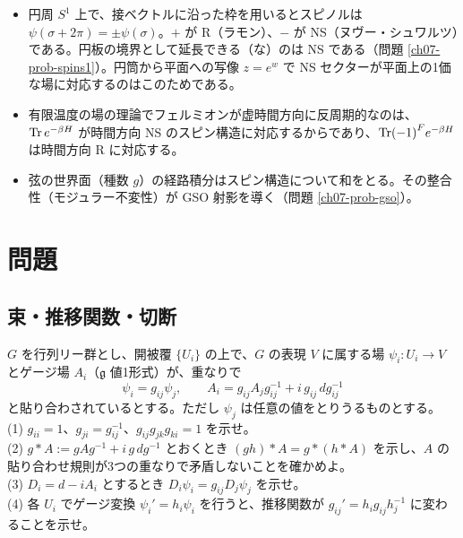 \begin{physbox}[：スピン構造とフェルミオンの境界条件]
\begin{itemize}
\item 円周 $S^1$ 上で、接ベクトルに沿った枠を用いるとスピノルは $\psi(\sigma+2\pi)=\pm\psi(\sigma)$。$+$ が R（ラモン）、$-$ が NS（ヌヴー・シュワルツ）である。円板の境界として延長できる（な）のは NS である（問題 \ref{ch07-prob-spins1}）。円筒から平面への写像 $z=e^{w}$ で NS セクターが平面上の1価な場に対応するのはこのためである。
\item 有限温度の場の理論でフェルミオンが虚時間方向に反周期的なのは、$\Tr e^{-\beta H}$ が時間方向 NS のスピン構造に対応するからであり、$\Tr(-1)^Fe^{-\beta H}$ は時間方向 R に対応する。
\item 弦の世界面（種数 $g$）の経路積分はスピン構造について和をとる。その整合性（モジュラー不変性）が GSO 射影を導く（問題 \ref{ch07-prob-gso}）。
\end{itemize}
\end{physbox}

\section{問題}

\subsection{束・推移関数・切断}

\begin{problem}[難易度 A]\label{ch07-prob-cocycle}
$G$ を行列リー群とし、開被覆 $\{U_i\}$ の上で、$G$ の表現 $V$ に属する場 $\psi_i\colon U_i\to V$ とゲージ場 $A_i$（$\mathfrak g$ 値1形式）が、重なりで
\[
\psi_i=g_{ij}\psi_j,\qquad A_i=g_{ij}A_jg_{ij}^{-1}+i\,g_{ij}\,dg_{ij}^{-1}
\]
と貼り合わされているとする。ただし $\psi_j$ は任意の値をとりうるものとする。\\
(1) $g_{ii}=1$、$g_{ji}=g_{ij}^{-1}$、$g_{ij}g_{jk}g_{ki}=1$ を示せ。\\
(2) $g\ast A:=gAg^{-1}+i\,g\,dg^{-1}$ とおくとき $(gh)\ast A=g\ast(h\ast A)$ を示し、$A$ の貼り合わせ規則が3つの重なりで矛盾しないことを確かめよ。\\
(3) $D_i=d-iA_i$ とするとき $D_i\psi_i=g_{ij}D_j\psi_j$ を示せ。\\
(4) 各 $U_i$ でゲージ変換 $\psi_i'=h_i\psi_i$ を行うと、推移関数が $g_{ij}'=h_ig_{ij}h_j^{-1}$ に変わることを示せ。
\end{problem}

